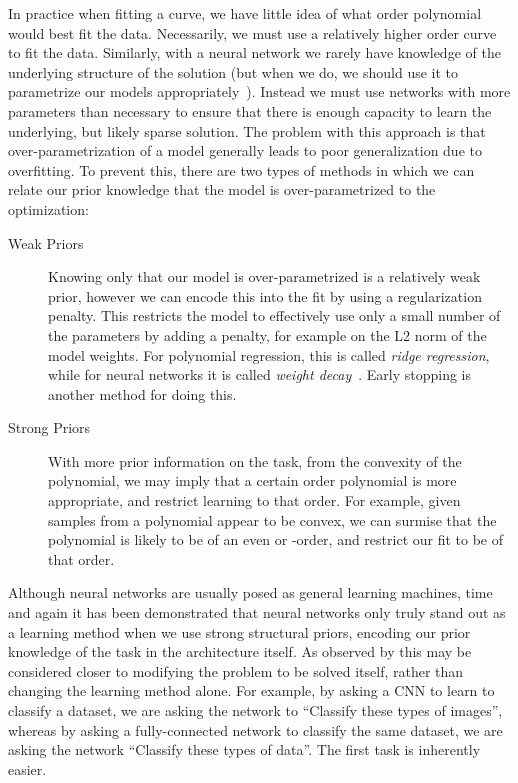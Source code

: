 \documentclass[thesis]{subfiles}
\begin{document}
	In practice when fitting a curve, we have little idea of what order polynomial would best fit the data. Necessarily, we must use a relatively higher order curve to fit the data. Similarly, with a neural network we rarely have knowledge of the underlying structure of the solution (but when we do, we should use it to parametrize our models appropriately~\citep{jain2016structural}). Instead we must use networks with more parameters than necessary to ensure that there is enough capacity to learn the underlying, but likely sparse solution. The problem with this approach is that over-parametrization of a model generally leads to poor generalization due to overfitting. To prevent this, there are two types of methods in which we can relate our prior knowledge that the model is over-parametrized to the optimization:
	\begin{description}
	\item[Weak Priors]
	Knowing only that our model is over-parametrized is a relatively weak prior, however we can encode this into the fit by using a regularization penalty. This restricts the model to effectively use only a small number of the parameters by adding a penalty, for example on the L2 norm of the model weights. For polynomial regression, this is called \emph{ridge regression}, while for neural networks it is called \emph{weight decay}~\cite{hinton1987learning}. Early stopping is another method for doing this.
	
	\item[Strong Priors]
	With more prior information on the task, \eg from the convexity of the polynomial, we may imply that a certain order polynomial is more appropriate, and restrict learning to that order. For example, given samples from a polynomial appear to be convex, we can surmise that the polynomial is likely to be of an even or -order, and restrict our fit to be of that order. 
    \end{description}
    
	Although neural networks are usually posed as general learning machines, time and again it has been demonstrated that neural networks only truly stand out as a learning method when we use strong structural priors, encoding our prior knowledge of the task in the architecture itself. As observed by \citet{denker1987large} this may be considered closer to modifying the problem to be solved itself, rather than changing the learning method alone. For example, by asking a CNN to learn to classify a dataset, we are asking the network to ``Classify these types of images'', whereas by asking a fully-connected network to classify the same dataset, we are asking the network ``Classify these types of data''. The first task is inherently easier.
\end{document}
